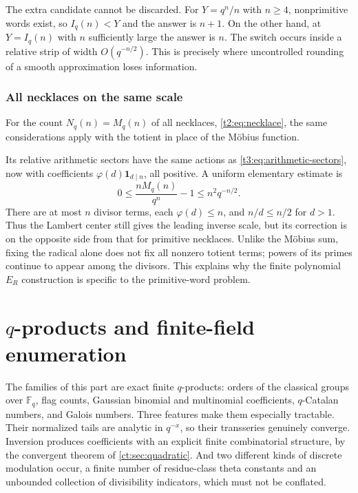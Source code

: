 \documentclass[11pt,openany]{book}
\numberwithin{equation}{chapter}
\theoremstyle{plain}
\theoremstyle{definition}
\theoremstyle{remark}
\newcommand{\F}{\mathbb F}
\newcommand{\one}{\mathbf 1}
\begin{document}
The extra candidate cannot be discarded. For $Y=q^n/n$ with $n\ge4$, nonprimitive words exist, so $I_q(n)<Y$ and the answer is $n+1$. On the other hand, at $Y=I_q(n)$ with $n$ sufficiently large the answer is $n$. The switch occurs inside a relative strip of width $O(q^{-n/2})$. This is precisely where uncontrolled rounding of a smooth approximation loses information.

\section{All necklaces on the same scale}
\label{ct:sec:all-necklaces}

For the count $N_q(n)=M_q(n)$ of all necklaces, \cref{t2:eq:necklace}, the
same considerations apply with the totient in place of the M\"obius function.

Its relative arithmetic sectors have the same actions as \eqref{t3:eq:arithmetic-sectors}, now with coefficients $\varphi(d)\one_{d\mid n}$, all positive. A uniform elementary estimate is
\[
 0\le\frac{nM_q(n)}{q^n}-1
 \le n^2q^{-n/2}.
\]
There are at most $n$ divisor terms, each $\varphi(d)\le n$, and $n/d\le n/2$ for $d>1$. Thus the Lambert center still gives the leading inverse scale, but its correction is on the opposite side from that for primitive necklaces. Unlike the M\"obius sum, fixing the radical alone does not fix all nonzero totient terms; powers of its primes continue to appear among the divisors. This explains why the finite polynomial $E_R$ construction is specific to the primitive-word problem.

\part{$q$-products and finite-field enumeration}
\label{ct:part:qproducts}

The families of this part are exact finite $q$-products: orders of the
classical groups over $\F_q$, flag counts, Gaussian binomial and multinomial
coefficients, $q$-Catalan numbers, and Galois numbers.  Three features make
them especially tractable.  Their normalized tails are analytic in $q^{-x}$,
so their transseries genuinely converge.  Inversion produces coefficients
with an explicit finite combinatorial structure, by the convergent theorem
of \cref{ct:sec:quadratic}.  And two different kinds of discrete modulation
occur, a finite number of residue-class theta constants and an unbounded
collection of divisibility indicators, which must not be conflated.
\end{document}
